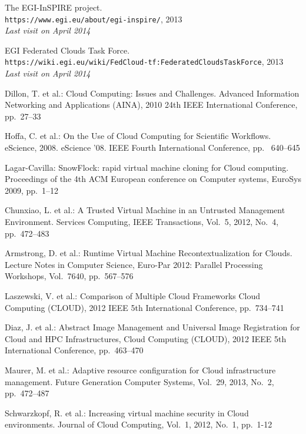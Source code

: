 \documentclass{cai}
\begin{document}
\begin{thebibliography}{99}

The EGI-InSPIRE project. \\
\texttt{https://www.egi.eu/about/egi-inspire/}, 2013 \\
\textit{Last visit on April 2014}

EGI Federated Clouds Task Force. \\
\texttt{https://wiki.egi.eu/wiki/FedCloud-tf:FederatedCloudsTaskForce}, 2013 \\
\textit{Last visit on April 2014}

Dillon, T. et al.: Cloud Computing: Issues and Challenges.
Advanced Information Networking and Applications (AINA), 2010 24th IEEE International Conference, pp.~27--33

Hoffa, C. et al.: On the Use of Cloud Computing for Scientific Workflows.
eScience, 2008. eScience '08. IEEE Fourth International Conference, pp. ~640--645

Lagar-Cavilla: SnowFlock: rapid virtual machine cloning for Cloud computing.
Proceedings of the 4th ACM European conference on Computer systems, EuroSys 2009, pp.~1--12

Chunxiao, L. et al.: A Trusted Virtual Machine in an Untrusted Management Environment.
Services Computing, IEEE Transactions, 
Vol.~5, 2012, No.~4, pp.~472--483

Armstrong, D. et al.: Runtime Virtual Machine Recontextualization for Clouds.
Lecture Notes in Computer Science, Euro-Par 2012: Parallel Processing Workshops, 
Vol.~7640, pp.~567--576

Laszewski, V. et al.: Comparison of Multiple Cloud Frameworks
Cloud Computing (CLOUD), 2012 IEEE 5th International Conference, pp.~734--741

Diaz, J. et al.: Abstract Image Management and Universal Image Registration for Cloud and HPC Infrastructures,
Cloud Computing (CLOUD), 2012 IEEE 5th International Conference, pp.~463--470

Maurer, M. et al.: Adaptive resource configuration for Cloud infrastructure management.
Future Generation Computer Systems,
Vol.~29, 2013, No.~2, pp.~472--487

Schwarzkopf, R. et al.: Increasing virtual machine security in Cloud environments.
Journal of Cloud Computing,
Vol.~1, 2012, No.~1, pp.~1-12


\end{thebibliography}
\end{document}
